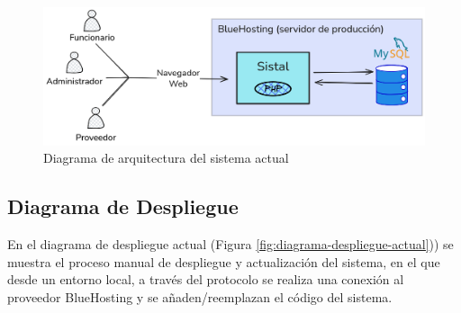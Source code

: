 \begin{figure}[htbp]
    \centering
    \includegraphics[width=\textwidth]{figuras/diagramas-actuales/diagrama-de-arquitectura}
    \caption{Diagrama de arquitectura del sistema actual}
    \label{fig:diagrama-arq-actual}
\end{figure}

\subsection{Diagrama de Despliegue}

En el diagrama de despliegue actual (Figura \ref{fig:diagrama-despliegue-actual})) se muestra el proceso manual de despliegue y actualización del sistema, en el que desde un entorno local, a través del protocolo  se realiza una conexión al proveedor BlueHosting y se añaden/reemplazan el código del sistema.

